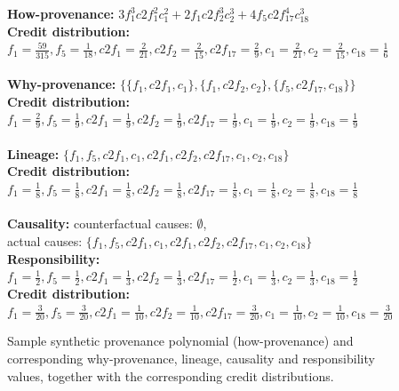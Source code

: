 \begin{figure}
{\footnotesize{\bf How-provenance:}
$
3 f_1^3 c2f_1^2 c_1^2 + 2 f_1 c2f_2^3 c_2^3 + 4 f_5 c2f_{17}^4 c_{18}^3
$ }\\
\hspace{0.5in} 
{\footnotesize{\bf Credit distribution:}\\ $f_1 = \frac{59}{315}, f_5 = \frac{1}{18}, c2f_1 = \frac{2}{21}, c2f_2 = \frac{2}{15}, 
c2f_{17}=\frac{2}{9} , c_1 = \frac{2}{21}, c_2 = \frac{2}{15}, c_{18} = \frac{1}{6} 
$
}
\\
\\
{\footnotesize{\bf Why-provenance:}
$
\{ \{f_1, c2f_1, c_1\}, \{f_1, c2f_2, c_2\}, \{ f_5, c2f_{17}, c_{18}\} \}
$ 
}
\\
{\footnotesize{\bf Credit distribution:}\\
$
f_1 = \frac{2}{9}, f_5 = \frac{1}{9}, c2f_1 = \frac{1}{9}, c2f_2 = \frac{1}{9}, 
c2f_{17}=\frac{1}{9} , c_1 = \frac{1}{9}, c_2 = \frac{1}{9}, c_{18} = \frac{1}{9} 
$
}
\\
\\
{\footnotesize{\bf Lineage: }
$
\{f_1, f_5, c2f_1, c_1, c2f_1, c2f_2, c2f_{17}, c_1, c_2, c_{18} \}
$}
\\
{\footnotesize{\bf Credit distribution:}\\
$
f_1 = \frac{1}{8}, f_5 = \frac{1}{8}, c2f_1 = \frac{1}{8}, c2f_2 = \frac{1}{8}, 
c2f_{17}=\frac{1}{8} , c_1 = \frac{1}{8}, c_2 = \frac{1}{8}, c_{18} = \frac{1}{8} 
$}
\\
\\
{\footnotesize{\bf Causality:}
counterfactual causes: $\emptyset$,\\
actual causes: $\{f_1, f_5, c2f_1, c_1, c2f_1, c2f_2, c2f_{17}, c_1, c_2, c_{18} \}$ \\
\textbf{Responsibility:}\\ 
$
f_1 = \frac{1}{2}, f_5 = \frac{1}{2}, c2f_1 = \frac{1}{3}, c2f_2 = \frac{1}{3}, 
c2f_{17}=\frac{1}{2} , c_1 = \frac{1}{3}, c_2 = \frac{1}{3}, c_{18} = \frac{1}{2}  
$
}
\\
{\footnotesize{\bf Credit distribution:}\\
$
f_1 = \frac{3}{20}, f_5 = \frac{3}{20}, c2f_1 = \frac{1}{10}, c2f_2 = \frac{1}{10}, 
c2f_{17}=\frac{3}{20} , c_1 = \frac{1}{10}, c_2 = \frac{1}{10}, c_{18} = \frac{3}{20}  
$
}
 \caption{Sample synthetic provenance polynomial (how-provenance) and corresponding why-provenance, lineage, causality and  responsibility values, together with the corresponding credit distributions.}
 \label{fig:syntheticDistributions}
 \end{figure}

